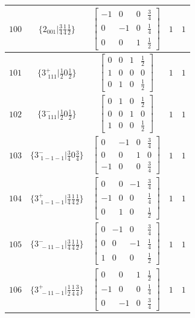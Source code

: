 \documentclass[fleqn,8pt]{jsarticle}
\begin{document}
\begin{longtable}{ccccc}
$ 100 $ & $ \{2{}_{001}|\frac{3}{4} \frac{1}{4} \frac{1}{2}\} $ & $ \begin{bmatrix} -1 & 0 & 0 & \frac{3}{4} \\ 0 & -1 & 0 & \frac{1}{4} \\ 0 & 0 & 1 & \frac{1}{2} \end{bmatrix} $ & $ 1 $ & $ 1 $ \\ \hline
$ 101 $ & $ \{3^{+}_{\,\,111}|\frac{1}{2} 0 \frac{1}{2}\} $ & $ \begin{bmatrix} 0 & 0 & 1 & \frac{1}{2} \\ 1 & 0 & 0 & 0 \\ 0 & 1 & 0 & \frac{1}{2} \end{bmatrix} $ & $ 1 $ & $ 1 $ \\ \hline
$ 102 $ & $ \{3^{-}_{\,\,111}|\frac{1}{2} 0 \frac{1}{2}\} $ & $ \begin{bmatrix} 0 & 1 & 0 & \frac{1}{2} \\ 0 & 0 & 1 & 0 \\ 1 & 0 & 0 & \frac{1}{2} \end{bmatrix} $ & $ 1 $ & $ 1 $ \\ \hline
$ 103 $ & $ \{3^{-}_{\,\,1-1-1}|\frac{3}{4} 0 \frac{3}{4}\} $ & $ \begin{bmatrix} 0 & -1 & 0 & \frac{3}{4} \\ 0 & 0 & 1 & 0 \\ -1 & 0 & 0 & \frac{3}{4} \end{bmatrix} $ & $ 1 $ & $ 1 $ \\ \hline
$ 104 $ & $ \{3^{+}_{\,\,1-1-1}|\frac{3}{4} \frac{1}{4} \frac{1}{2}\} $ & $ \begin{bmatrix} 0 & 0 & -1 & \frac{3}{4} \\ -1 & 0 & 0 & \frac{1}{4} \\ 0 & 1 & 0 & \frac{1}{2} \end{bmatrix} $ & $ 1 $ & $ 1 $ \\ \hline
$ 105 $ & $ \{3^{-}_{\,\,-11-1}|\frac{3}{4} \frac{1}{4} \frac{1}{2}\} $ & $ \begin{bmatrix} 0 & -1 & 0 & \frac{3}{4} \\ 0 & 0 & -1 & \frac{1}{4} \\ 1 & 0 & 0 & \frac{1}{2} \end{bmatrix} $ & $ 1 $ & $ 1 $ \\ \hline
$ 106 $ & $ \{3^{+}_{\,\,-11-1}|\frac{1}{2} \frac{1}{4} \frac{3}{4}\} $ & $ \begin{bmatrix} 0 & 0 & 1 & \frac{1}{2} \\ -1 & 0 & 0 & \frac{1}{4} \\ 0 & -1 & 0 & \frac{3}{4} \end{bmatrix} $ & $ 1 $ & $ 1 $ \\ \hline

\end{longtable}
\end{document}
